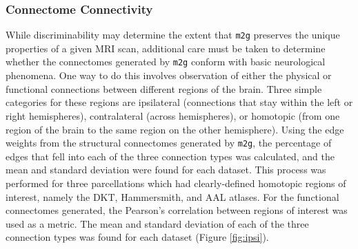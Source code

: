 \subsubsection{Connectome Connectivity}
While discriminability may determine the extent that \texttt{m2g} preserves the unique properties of a given MRI scan, additional care must be taken to determine whether the connectomes generated by \texttt{m2g} conform with basic neurological phenomena. One way to do this involves observation of either the physical or functional connections between different regions of the brain. Three simple categories for these regions are ipsilateral (connections that stay within the left or right hemispheres), contralateral (across hemispheres), or homotopic (from one region of the brain to the same region on the other hemisphere).
Using the edge weights from the structural connectomes generated by \texttt{m2g}, the percentage of edges that fell into each of the three connection types was calculated, and the mean and standard deviation were found for each dataset. This process was performed for three parcellations which had clearly-defined homotopic regions of interest, namely the DKT, Hammersmith, and AAL atlases. For the functional connectomes generated, the Pearson's correlation between regions of interest was used as a metric. The mean and standard deviation of each of the three connection types was found for each dataset (Figure \ref{fig:ipsi}). 



